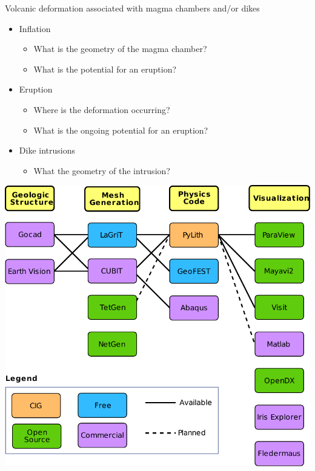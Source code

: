 \documentclass[pdftex,cig,slideColor]{pp4slides}
\begin{document}
  \vfill
  Volcanic deformation associated with magma chambers and/or dikes
  \begin{itemize}
  \item Inflation
    \begin{itemize}
    \item What is the geometry of the magma chamber?
    \item What is the potential for an eruption?
    \end{itemize}
  \item Eruption
    \begin{itemize}
    \item Where is the deformation occurring?
    \item What is the ongoing potential for an eruption?
    \end{itemize}
  \item Dike intrusions
    \begin{itemize}
    \item What the geometry of the intrusion?
    \end{itemize}
  \end{itemize}
  \vfill



  \vfill
  \begin{center}
    \includegraphics[scale=1.15]{figs/workflow}
  \end{center}
  \vfill
\end{document}

